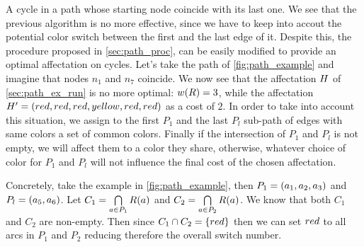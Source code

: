 A cycle in a path whose starting node coincide with its last one.
We see that the previous algorithm is no more effective, since we have to keep into accout the potential color switch between the first and the last edge of it.
Despite this, the procedure proposed in \cref{sec:path_proc}, can be easily modified to provide an optimal affectation on cycles.
Let's take the path of \cref{fig:path_example} and imagine that nodes $n_1$ and $n_7$ coincide.
We now see that the affectation $H$ of \cref{sec:path_ex_run} is no more optimal: $w(R) = 3$, while the affectation $H' = (red, red, red, yellow, red, red)$ as a cost of $2$.
In order to take into account this situation, we assign to the first $P_1$ and the last $P_l$ sub-path of edges with same colors a set of common colors. Finally if the intersection of $P_1$ and $P_l$ is not empty, we will affect them to a color they share, otherwise, whatever choice of color for $P_1$ and $P_l$ will not influence the final cost of the chosen affectation.

Concretely, take the example in \cref{fig:path_example}, then $P_1 = (a_1, a_2, a_3)$ and $P_l = (a_5, a_6)$. Let $C_1 = \bigcap\limits_{a\in P_1} R(a)$ and $C_2 = \bigcap\limits_{a\in P_2} R(a)$. We know that both $C_1$ and $C_2$ are non-empty. Then since $C_1 \cap C_2 = \{red\}$ then we can set $red$ to all arcs in $P_1$ and $P_2$ reducing therefore the overall switch number.

